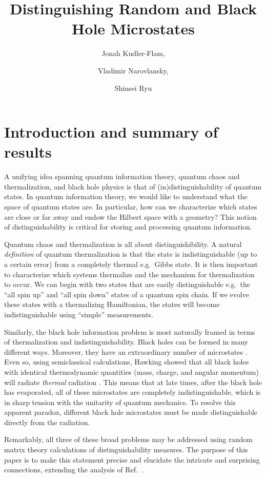 \documentclass[a4paper,11pt]{article}
\title{Distinguishing Random and Black Hole Microstates
}
\author[a]{Jonah Kudler-Flam,}
\author[b]{Vladimir Narovlansky,}
\author[b,c]{Shinsei Ryu}
\affiliation[a]{Kadanoff Center for Theoretical Physics, University of Chicago, Chicago, IL~60637, USA}
\affiliation[b]{Princeton Center for Theoretical Science,
Princeton University, Princeton, NJ 08544, USA}
\affiliation[c]{Department of Physics, Princeton University, Princeton, NJ 08544, 08540, USA}
\begin{document}
 
\maketitle
\flushbottom

\section{Introduction and summary of results}


A unifying idea spanning quantum information theory, quantum chaos and thermalization, and black hole physics is that of (in)distinguishability of quantum states. In quantum information theory, we would like to understand what the space of quantum states are. In particular, how can we characterize which states are close or far away and endow the Hilbert space with a geometry?
This notion of distinguishability is critical for storing and processing quantum information.

Quantum chaos and thermalization is all about distinguishibility. A natural \textit{definition} of quantum thermalization is that the state is indistinguishable (up to a certain error) from a completely thermal e.g.~Gibbs state. It is then important to characterize which systems thermalize and the mechanism for thermalization to occur. We can begin with two states that are easily distinguishable e.g.~the ``all spin up'' and ``all spin down'' states of a quantum spin chain. If we evolve these states with a thermalizing Hamiltonian, the states will become indistinguishable using ``simple'' measurements.

Similarly, the black hole information problem is most naturally framed in terms of thermalization and indistinguishability. Black holes can be formed in many different ways. Moreover, they have an extraordinary number of microstates \cite{Bekenstein:1973ur,cmp/1103899181}. Even so, using semiclassical calculations, Hawking showed that all black holes with identical thermodynamic quantities (mass, charge, and angular momentum) will radiate \textit{thermal} radiation \cite{cmp/1103899181}. This means that at late times, after the black hole has evaporated, all of these microstates are completely indistinguishable, which is in sharp tension with the unitarity of quantum mechanics. To resolve this apparent paradox, different black hole microstates must be made distinguishable directly from the radiation.

Remarkably, all three of these broad problems may be addressed using random matrix theory calculations of distinguishability measures. The purpose of this paper is to make this statement precise and elucidate the intricate and surprising connections, extending the analysis of Ref.~\cite{2021PhRvL.126q1603K}. 
\end{document}
